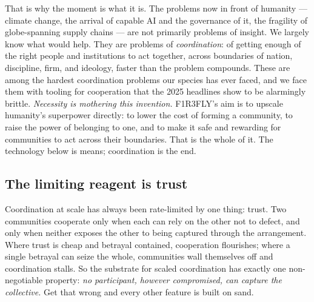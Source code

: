 \documentclass[11pt]{article}
\begin{document}
That is why the moment is what it is. The problems now in front of humanity --- climate change, the arrival of capable AI and the governance of it, the fragility of globe-spanning supply chains --- are not primarily problems of insight. We largely know what would help. They are problems of \emph{coordination}: of getting enough of the right people and institutions to act together, across boundaries of nation, discipline, firm, and ideology, faster than the problem compounds. These are among the hardest coordination problems our species has ever faced, and we face them with tooling for cooperation that the 2025 headlines show to be alarmingly brittle. \emph{Necessity is mothering this invention.} F1R3FLY's aim is to upscale humanity's superpower directly: to lower the cost of forming a community, to raise the power of belonging to one, and to make it safe and rewarding for communities to act across their boundaries. That is the whole of it. The technology below is means; coordination is the end.

\subsection*{The limiting reagent is trust}

Coordination at scale has always been rate-limited by one thing: trust. Two communities cooperate only when each can rely on the other not to defect, and only when neither exposes the other to being captured through the arrangement. Where trust is cheap and betrayal contained, cooperation flourishes; where a single betrayal can seize the whole, communities wall themselves off and coordination stalls. So the substrate for scaled coordination has exactly one non-negotiable property: \emph{no participant, however compromised, can capture the collective.} Get that wrong and every other feature is built on sand.
\end{document}
